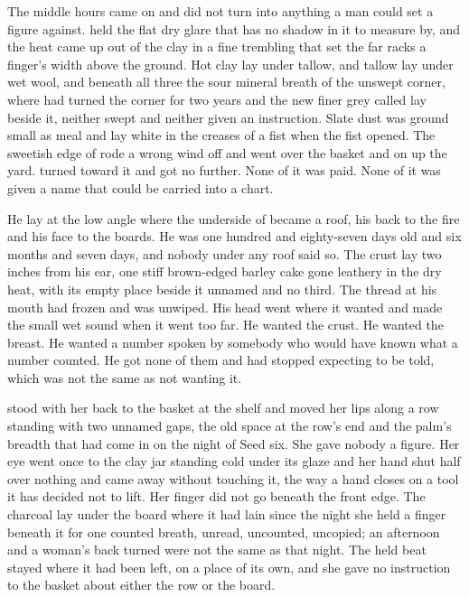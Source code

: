 The middle hours came on and did not turn into anything a man could set a figure against.  held the flat dry glare that has no shadow in it to measure by, and the heat came up out of the clay in a fine trembling that set the far racks a finger's width above the ground. Hot clay lay under tallow, and tallow lay under wet wool, and beneath all three the sour mineral breath of the unswept corner, where  had turned the corner for two years and the new finer grey called  lay beside it, neither swept and neither given an instruction. Slate dust was ground small as meal and lay white in the creases of a fist when the fist opened. The sweetish edge of  rode a wrong wind off  and went over the basket and on up the yard.  turned toward it and got no further. None of it was paid. None of it was given a name that could be carried into a chart.

He lay at the low angle where the underside of  became a roof, his back to the fire and his face to the boards. He was one hundred and eighty-seven days old and six months and seven days, and nobody under any roof said so. The crust lay two inches from his ear, one stiff brown-edged barley cake gone leathery in the dry heat, with its empty place beside it unnamed and no third. The thread at his mouth had frozen and was unwiped. His head went where it wanted and made the small wet sound when it went too far. He wanted the crust. He wanted the breast. He wanted a number spoken by somebody who would have known what a number counted. He got none of them and had stopped expecting to be told, which was not the same as not wanting it.

 stood with her back to the basket at the shelf and moved her lips along a row standing with two unnamed gaps, the old space at the row's end and the palm's breadth that had come in on the night of Seed six. She gave nobody a figure. Her eye went once to the clay jar standing cold under its glaze and her hand shut half over nothing and came away without touching it, the way a hand closes on a tool it has decided not to lift. Her finger did not go beneath the front edge. The charcoal lay under the board where it had lain since the night she held a finger beneath it for one counted breath, unread, uncounted, uncopied; an afternoon and a woman's back turned were not the same as that night. The held beat stayed where it had been left, on a place of its own, and she gave no instruction to the basket about either the row or the board.

